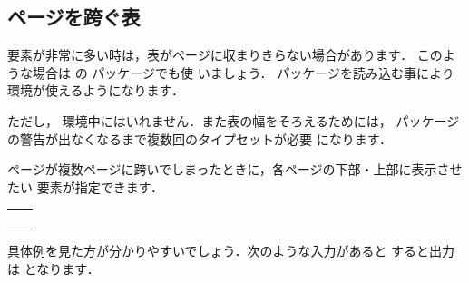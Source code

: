 
\subsection{ページを跨ぐ表\zdash{}}

要素が非常に多い時は，表がページに収まりきらない場合があります．
このような場合は の  パッケージでも使
いましょう．  パッケージを読み込む事により 
環境が使えるようになります．

ただし，  環境中にはいれません．また表の幅をそろえるためには，
パッケージの警告が出なくなるまで複数回のタイプセットが必要
になります．

ページが複数ページに跨いでしまったときに，各ページの下部・上部に表示させたい
要素が指定できます．
\begin{Syntax}
\begin{tabular}{ll}
\va{要素} \C{endfirsthead}
 & \pp{表の最初のページの上部にだけ表示する行の要素}\\
\va{要素} \C{endhead}
 & \pp{行がページを跨ぐときページ上部に表示する要素}\\
\va{要素} \C{endfoot}
 & \pp{行がページを跨ぐときページ下部に表示する要素}\\
\va{要素} \C{endlastfoot}
 & \pp{表の最後のページの下部だけに表示する行の要素}
\end{tabular}
\end{Syntax}
具体例を見た方が分かりやすいでしょう．次のような入力があると
すると出力は  となります．

